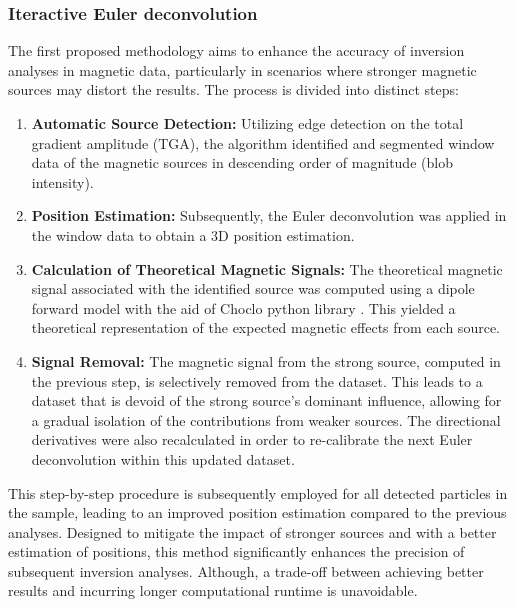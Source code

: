 \subsubsection{Iteractive Euler deconvolution}

The first proposed methodology aims to enhance the accuracy of inversion analyses in magnetic data, particularly in scenarios where stronger magnetic sources may distort the results. The process is divided into distinct steps:

\begin{enumerate}
  \item \textbf{Automatic Source Detection:} Utilizing edge detection on the total gradient amplitude (TGA), the algorithm identified and segmented window data of the magnetic sources in descending order of magnitude (blob intensity). 

  \item \textbf{Position Estimation:} Subsequently, the Euler deconvolution was applied in the window data to obtain a 3D position estimation.
  
  \item \textbf{Calculation of Theoretical Magnetic Signals:} The theoretical magnetic signal associated with the identified source was computed using a dipole forward model with the aid of Choclo python library \citep{choclo2022}. This yielded a theoretical representation of the expected magnetic effects from each source.
  
  \item \textbf{Signal Removal:} The magnetic signal from the strong source, computed in the previous step, is selectively removed from the dataset. This leads to a dataset that is devoid of the strong source's dominant influence, allowing for a gradual isolation of the contributions from weaker sources. The directional derivatives were also recalculated in order to re-calibrate the next Euler deconvolution within this updated dataset.
    
\end{enumerate}

This step-by-step procedure is subsequently employed for all detected particles in the sample, leading to an improved position estimation compared to the previous analyses. Designed to mitigate the impact of stronger sources and with a better estimation of positions, this method significantly enhances the precision of subsequent inversion analyses. Although, a trade-off between achieving better results and incurring longer computational runtime is unavoidable. 



